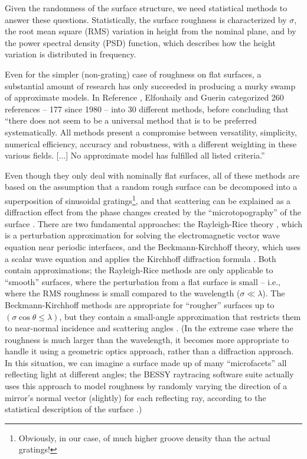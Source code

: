 Given the randomness of the surface structure, we need statistical methods to answer these questions.  Statistically, the surface roughness is characterized by $\sigma$, the root mean square (RMS) variation in height from the nominal plane, and by the power spectral density (PSD) function, which describes how the height variation is distributed in frequency.

Even for the simpler (non-grating) case of roughness on flat surfaces, a substantial amount of research has only succeeded in producing a murky swamp of approximate models.  In Reference \cite{Elf04}, Elfouhaily and Guerin categorized 260 references -- 177 since 1980 -- into 30 different methods, before concluding that ``there does not seem to be a universal method that is to be preferred systematically. All methods present a compromise between versatility, simplicity, numerical efficiency, accuracy and robustness, with a different weighting in these various fields. [...] No approximate model has fulfilled all listed criteria.''

Even though they only deal with nominally flat surfaces, all of these methods are based on the assumption that a random rough surface can be decomposed into a superposition of sinusoidal gratings\footnote{Obviously, in our case, of much higher groove density than the actual gratings!}, and that scattering can be explained as a diffraction effect from the phase changes created by the ``microtopography'' of the surface \cite{Rag07}.  There are two fundamental approaches: the Rayleigh-Rice theory \cite{Ray07,Ric51}, which is a perturbation approximation for solving the electromagnetic vector wave equation near periodic interfaces, and the Beckmann-Kirchhoff theory, which uses a scalar wave equation and applies the Kirchhoff diffraction formula \cite[Chapters 4 and 5]{Bec87}.  Both contain approximations; the Rayleigh-Rice methods are only applicable to ``smooth'' surfaces, where the perturbation from a flat surface is small -- i.e., where the RMS roughness is small compared to the wavelength ($\sigma \ll \lambda$).  The Beckmann-Kirchhoff methods are appropriate for ``rougher'' surfaces up to $(\sigma \cos \theta \leq \lambda)$, but they contain a small-angle approximation that restricts them to near-normal incidence and scattering angles \cite{Rag07}.  (In the extreme case where the roughness is much larger than the wavelength, it becomes more appropriate to handle it using a geometric optics approach, rather than a diffraction approach.  In this situation, we can imagine a surface made up of many ``microfacets'' all reflecting light at different angles; the BESSY raytracing software suite actually uses this approach to model roughness by randomly varying the direction of a mirror's normal vector (slightly) for each reflecting ray, according to the statistical description of the surface \cite{Sch}.)

